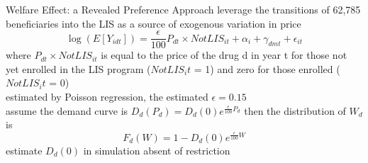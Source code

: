 \begin{frame}{Welfare Effect: a Revealed Preference Approach}
    leverage the transitions of 62,785 beneficiaries into the LIS as a source of exogenous variation in price \\
    \begin{equation}
        \log(E[Y_{idt}])=\frac{\epsilon}{100}P_{dt}\times NotLIS_{it} + \alpha_i + \gamma_{dmt} + \epsilon_{it}
    \end{equation}
    where $P_{dt}\times NotLIS_{it}$ is equal to the price of the drug d in year t for those not yet enrolled in the LIS program ($NotLIS_it$ = 1) and zero for those enrolled ($NotLIS_it$ = 0) \\
    estimated by Poisson regression, the estimated $\epsilon = 0.15$ \\
    assume the demand curve is $D_d(P_d) = D_d(0)e^{\frac{\epsilon}{100}P_d}$
    then the distribution of $W_d$ is $$F_d(W)=1-D_d(0)e^{\frac{\epsilon}{100}W}$$
    estimate $D_d(0)$ in simulation absent of restriction
\end{frame}


